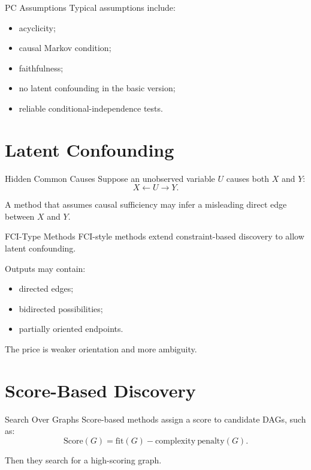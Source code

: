 \documentclass[aspectratio=169,11pt]{beamer}
\begin{document}
\begin{frame}{PC Assumptions}
Typical assumptions include:
\begin{itemize}
\item acyclicity;
\item causal Markov condition;
\item faithfulness;
\item no latent confounding in the basic version;
\item reliable conditional-independence tests.
\end{itemize}
\end{frame}

\section{Latent Confounding}

\begin{frame}{Hidden Common Causes}
Suppose an unobserved variable \(U\) causes both \(X\) and \(Y\):
\[
X \leftarrow U \rightarrow Y.
\]

A method that assumes causal sufficiency may infer a misleading direct edge between \(X\) and \(Y\).
\end{frame}

\begin{frame}{FCI-Type Methods}
FCI-style methods extend constraint-based discovery to allow latent confounding.

Outputs may contain:
\begin{itemize}
\item directed edges;
\item bidirected possibilities;
\item partially oriented endpoints.
\end{itemize}

The price is weaker orientation and more ambiguity.
\end{frame}

\section{Score-Based Discovery}

\begin{frame}{Search Over Graphs}
Score-based methods assign a score to candidate DAGs, such as:
\[
\mathrm{Score}(G)
=
\mathrm{fit}(G)
-
\mathrm{complexity\ penalty}(G).
\]

Then they search for a high-scoring graph.
\end{frame}
\end{document}
